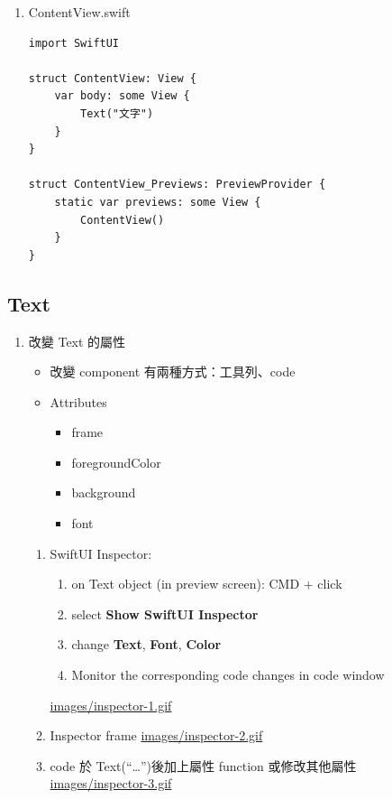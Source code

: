 \documentclass[a4paper,12pt]{article}
\begin{document}
\begin{enumerate}
\item ContentView.swift
\label{sec:org161888f}
\lstset{breaklines=true,language=swift,label= ,caption= ,captionpos=b,firstnumber=1,numbers=left}
\begin{lstlisting}
import SwiftUI

struct ContentView: View {
    var body: some View {
        Text("文字")
    }
}

struct ContentView_Previews: PreviewProvider {
    static var previews: some View {
        ContentView()
    }
}
\end{lstlisting}
\end{enumerate}

\subsection{Text}
\label{sec:org9803c3c}
\begin{enumerate}
\item 改變 Text 的屬性
\label{sec:orgb96dcbb}
\begin{itemize}
\item 改變 component 有兩種方式：工具列、code\\
\item Attributes\\
\begin{itemize}
\item frame\\
\item foregroundColor\\
\item background\\
\item font\\
\end{itemize}
\end{itemize}

\begin{enumerate}
\item SwiftUI Inspector:
\label{sec:org937f96b}
\begin{enumerate}
\item on Text object (in preview screen): CMD + click\\
\item select \textbf{Show SwiftUI Inspector}\\
\item change \textbf{Text}, \textbf{Font}, \textbf{Color}\\
\item Monitor the corresponding code changes in code window\\
\end{enumerate}
\url{images/inspector-1.gif}\\
\item Inspector frame
\label{sec:org1c99f49}
\url{images/inspector-2.gif}\\
\item code
\label{sec:orgad8541d}
於 Text(``\ldots{}'')後加上屬性 function 或修改其他屬性\\
\url{images/inspector-3.gif}\\
\end{enumerate}
\end{enumerate}
\end{document}
